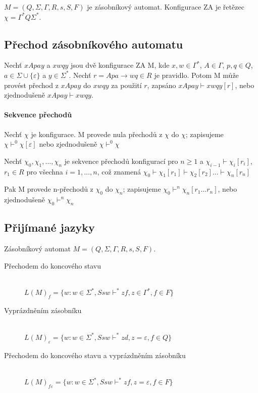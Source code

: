 \documentclass[a4paper, 11pt]{report}
\begin{document}
$M = (Q, \Sigma, \Gamma, R, s, S, F)$ je zásobníkový automat. Konfigurace ZA je řetězec $\chi = \Gamma^* Q \Sigma^*$.

\subsection{Přechod zásobníkového automatu}

Nechť $xApay$ a $xwqy$ jsou dvě konfigurace ZA M, kde $x, w \in \Gamma^*$, $A \in \Gamma$, $p, q \in Q$, $a \in \Sigma \cup \{ \varepsilon \}$ a $y \in \Sigma^*$. Nechť $r = Apa \to wq \in R$ je pravidlo. Potom M může provést přechod z $xApay$ do $xwqy$ za použití $r$, zapsáno $xApay \vdash xwqy [r]$, nebo zjednodušeně $xApay \vdash xwqy$.

\paragraph{Sekvence přechodů}

Nechť $\chi$ je konfigurace. M provede nula přechodů z $\chi$ do $\chi$; zapisujeme $\chi \vdash^0 \chi [\varepsilon]$ nebo zjednodušeně $\chi \vdash^0 \chi$

Nechť $\chi_0, \chi_1, \dots, \chi_n$ je sekvence přechodů konfigurací pro $n \geq 1$ a $\chi_{i-1} \vdash \chi_i [r_i]$, $r_1 \in R$ pro všechna $i = 1, \dots, n$, což znamená $\chi_0 \vdash \chi_1 [r_1] \vdash \chi_2 [r_2] \dots \vdash \chi_n [r_n]$

Pak M provede n-přechodů z $\chi_0$ do $\chi_n$; zapisujeme $\chi_0 \vdash^n \chi_n [r_1 \dots r_n]$, nebo zjednodušeně $\chi_0 \vdash^n \chi_n$

\subsection{Přijímané jazyky}

Zásobníkový automat $M = (Q, \Sigma, \Gamma, R, s, S, F)$.

\begin{description}
	\item[Přechodem do koncového stavu] \hfill \\
	$L(M)_f = \{w: w \in \Sigma^*, Ssw \vdash^* zf, z \in \Gamma^*, f \in F  \}$
	
	\item[Vyprázdněním zásobníku] \hfill \\
	$L(M)_{\varepsilon} = \{ w: w \in \Sigma^*, Ssw \vdash^* zd, z = \varepsilon, f \in Q \}$
	
	\item[Přechodem do koncového stavu a vyprázdněním zásobníku] \hfill \\
	$L(M)_{f \varepsilon} = \{ w: w \in \Sigma^*, Ssw \vdash^* zf, z = \varepsilon, f \in F \}$
\end{description}
\end{document}
